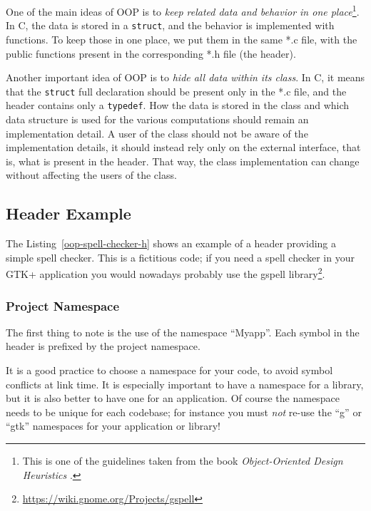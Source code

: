 One of the main ideas of OOP is to \emph{keep related data and behavior in one place}\footnote{This is one of the guidelines taken from the book \emph{Object-Oriented Design Heuristics} \cite{oop-book}.}. In C, the data is stored in a \lstinline{struct}, and the behavior is implemented with functions. To keep those in one place, we put them in the same *.c file, with the public functions present in the corresponding *.h file (the header).

Another important idea of OOP is to \emph{hide all data within its class}. In C, it means that the \lstinline{struct} full declaration should be present only in the *.c file, and the header contains only a \lstinline{typedef}. How the data is stored in the class and which data structure is used for the various computations should remain an implementation detail. A user of the class should not be aware of the implementation details, it should instead rely only on the external interface, that is, what is present in the header. That way, the class implementation can change without affecting the users of the class.

\subsection{Header Example}

The Listing~\ref{oop-spell-checker-h} shows an example of a header providing a simple spell checker. This is a fictitious code; if you need a spell checker in your GTK+ application you would nowadays probably use the gspell library\footnote{\url{https://wiki.gnome.org/Projects/gspell}}.



\subsubsection{Project Namespace}
The first thing to note is the use of the namespace ``Myapp''. Each symbol in the header is prefixed by the project namespace.

It is a good practice to choose a namespace for your code, to avoid symbol conflicts at link time. It is especially important to have a namespace for a library, but it is also better to have one for an application. Of course the namespace needs to be unique for each codebase; for instance you must \emph{not} re-use the ``g'' or ``gtk'' namespaces for your application or library!


